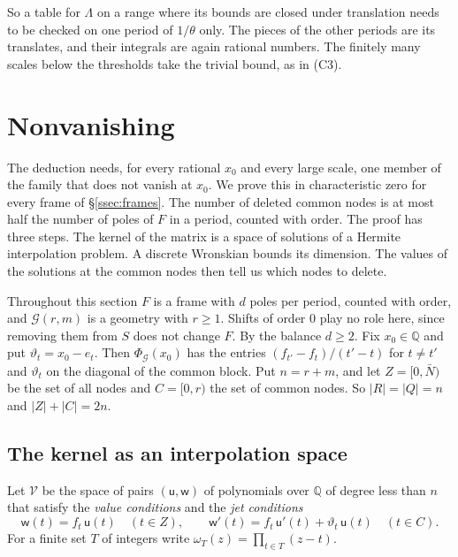 \documentclass[11pt]{amsart}
\theoremstyle{definition}
\theoremstyle{remark}
\numberwithin{equation}{section}
\newcommand{\Q}{\mathbb Q}
\begin{document}
So a table for $\Lambda$ on a range where its bounds are closed under translation needs to be checked on one period of
$1/\theta$ only. The pieces of the other periods are its translates, and their integrals are again rational numbers.
The finitely many scales below the thresholds take the trivial bound, as in (C3).

\section{Nonvanishing}\label{sec:nonvanishing}

The deduction needs, for every rational $x_0$ and every large scale, one member of the family that does not vanish at
$x_0$. We prove this in characteristic zero for every frame of \S\ref{ssec:frames}. The number of deleted common nodes
is at most half the number of poles of $F$ in a period, counted with order. The proof has three steps. The kernel of
the matrix is a space of solutions of a Hermite interpolation problem. A discrete Wronskian bounds its dimension. The
values of the solutions at the common nodes then tell us which nodes to delete.

Throughout this section $F$ is a frame with $d$ poles per period, counted with order, and $\mathcal G(r,m)$ is a
geometry with $r\ge1$. Shifts of order $0$ play no role here, since removing them from $S$ does not change $F$. By the
balance $d\ge2$. Fix $x_0\in\Q$ and put $\vartheta_t=x_0-e_t$. Then $\Phi_{\mathcal G}(x_0)$ has the entries
$(f_{t'}-f_t)/(t'-t)$ for $t\ne t'$ and $\vartheta_t$ on the diagonal of the common block. Put $n=r+m$, and let
$Z=[0,\bar N)$ be the set of all nodes and $C=[0,r)$ the set of common nodes. So $|R|=|Q|=n$ and $|Z|+|C|=2n$.

\subsection{The kernel as an interpolation space}\label{ssec:selection}
Let $\mathcal V$ be the space of pairs $(\mathsf u,\mathsf w)$ of polynomials over $\Q$ of degree less than $n$ that
satisfy the \emph{value conditions} and the \emph{jet conditions}
\[
 \mathsf w(t)=f_t\,\mathsf u(t)\quad(t\in Z),\qquad
 \mathsf w'(t)=f_t\,\mathsf u'(t)+\vartheta_t\,\mathsf u(t)\quad(t\in C).
\]
For a finite set $T$ of integers write $\omega_T(z)=\prod_{t\in T}(z-t)$.
\end{document}
